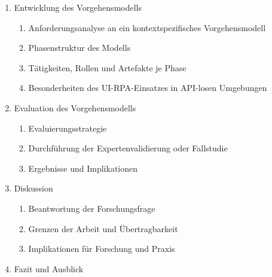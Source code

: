 {\begin{enumerate}
  \item Entwicklung des Vorgehensmodells
    \begin{enumerate}
      \item Anforderungsanalyse an ein kontextspezifisches Vorgehensmodell
      \item Phasenstruktur des Modells
      \item Tätigkeiten, Rollen und Artefakte je Phase
      \item Besonderheiten des \acs{UI}-\acs{RPA}-Einsatzes in \acs{API}-losen Umgebungen
    \end{enumerate}

  \item Evaluation des Vorgehensmodells
    \begin{enumerate}
      \item Evaluierungsstrategie
      \item Durchführung der Expertenvalidierung oder Fallstudie
      \item Ergebnisse und Implikationen
    \end{enumerate}

  \item Diskussion
    \begin{enumerate}
      \item Beantwortung der Forschungsfrage
      \item Grenzen der Arbeit und Übertragbarkeit
      \item Implikationen für Forschung und Praxis
    \end{enumerate}

  \item Fazit und Ausblick
\end{enumerate}
}


